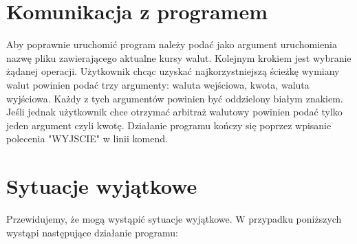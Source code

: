 ﻿\documentclass{article}
\begin{document}
\section{Komunikacja z programem}
Aby poprawnie uruchomić program należy podać jako argument uruchomienia nazwę pliku zawierającego aktualne kursy walut.
\newline\newline
Kolejnym krokiem jest wybranie żądanej operacji. Użytkownik chcąc uzyskać najkorzystniejszą ścieżkę wymiany walut powinien podać trzy argumenty: waluta wejściowa, kwota, waluta wyjściowa. Każdy z tych argumentów powinien być oddzielony białym znakiem. Jeśli jednak użytkownik chce otrzymać arbitraż walutowy powinien podać tylko jeden argument czyli kwotę.
\newline\newline
Działanie programu kończy się poprzez wpisanie polecenia "WYJSCIE" w linii komend.  
\newline\newline



\section{Sytuacje wyjątkowe}
Przewidujemy, że mogą wystąpić sytuacje wyjątkowe. W przypadku poniższych
wystąpi następujące działanie programu:
\end{document}
